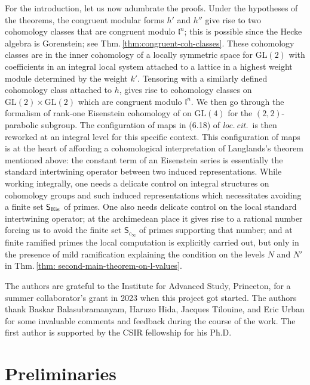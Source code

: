 \documentclass[11pt]{amsart}
\newcommand{\GL}{\mathrm{GL}}
\begin{document}
For the introduction, let us now adumbrate the proofs. 
Under the hypotheses of the theorems, the congruent modular forms $h'$ and $h''$ give rise to 
two cohomology classes that are congruent modulo $\mathfrak{l}^n$; this is possible since 
the Hecke algebra is Gorenstein; see Thm.\,\ref{thm:congruent-coh-classes}. These cohomology classes are in the inner cohomology of a locally symmetric space for 
$\GL(2)$ with coefficients in an integral local system attached to a lattice in a highest weight module determined by the weight $k'$. 
Tensoring with a similarly defined cohomology class attached to $h$, gives rise to cohomology classes on $\GL(2) \times \GL(2)$
which are congruent modulo $\mathfrak{l}^n$. We then go through the formalism of rank-one 
Eisenstein cohomology of \cite{harder-raghuram} on $\GL(4)$ for the $(2,2)$-parabolic subgroup. 
The configuration of maps in (6.18) of {\it loc.\,cit.}\ is then reworked at an integral level for this specific context. 
This configuration of maps is at the heart of affording a cohomological interpretation of Langlands's theorem mentioned above: 
the constant term of an Eisenstein series is essentially the standard intertwining operator between two induced representations. 
While working integrally, one needs a delicate control on integral structures on cohomology groups and such induced representations 
which necessitates avoiding a finite set $\mathsf{S}_{\textup{Eis}}$ of primes. One also needs delicate control on the local standard 
intertwining operator; at the archimedean place it gives rise to a rational number forcing us to avoid the finite set $\mathsf{S}_{c_{\infty}}$ of primes 
supporting that number;  
and at finite ramified primes the local computation is explicitly carried out, but only in the presence of mild ramification 
explaining the condition on the levels $N$ and $N'$ in Thm.\,\ref{thm: second-main-theorem-on-l-values}. 


\medskip

{\Small {} 
The authors are grateful to the Institute for Advanced Study, Princeton, for a summer collaborator's grant in 2023 when this project got started. 
The authors thank Baskar Balasubramanyam, Haruzo Hida, Jacques Tilouine, and Eric Urban for some invaluable comments and feedback 
during the course of the work. The first author is supported by the CSIR fellowship for his Ph.D.}

\medskip
\section{Preliminaries}
 
\end{document}
